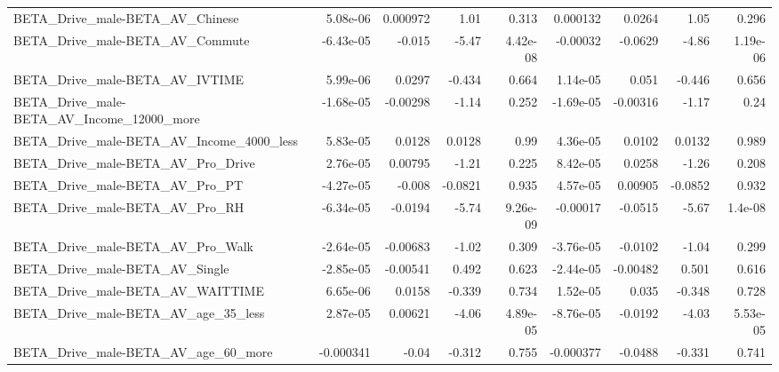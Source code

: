 \begin{tabular}{lrrrrrrrr}
BETA\_Drive\_male-BETA\_AV\_Chinese                    &    5.08e-06 &     0.000972 &      1.01 &    0.313 &   0.000132 &      0.0264 &         1.05 &         0.296 \\
BETA\_Drive\_male-BETA\_AV\_Commute                    &   -6.43e-05 &       -0.015 &     -5.47 & 4.42e-08 &   -0.00032 &     -0.0629 &        -4.86 &      1.19e-06 \\
BETA\_Drive\_male-BETA\_AV\_IVTIME                     &    5.99e-06 &       0.0297 &    -0.434 &    0.664 &   1.14e-05 &       0.051 &       -0.446 &         0.656 \\
BETA\_Drive\_male-BETA\_AV\_Income\_12000\_more          &   -1.68e-05 &     -0.00298 &     -1.14 &    0.252 &  -1.69e-05 &    -0.00316 &        -1.17 &          0.24 \\
BETA\_Drive\_male-BETA\_AV\_Income\_4000\_less           &    5.83e-05 &       0.0128 &    0.0128 &     0.99 &   4.36e-05 &      0.0102 &       0.0132 &         0.989 \\
BETA\_Drive\_male-BETA\_AV\_Pro\_Drive                  &    2.76e-05 &      0.00795 &     -1.21 &    0.225 &   8.42e-05 &      0.0258 &        -1.26 &         0.208 \\
BETA\_Drive\_male-BETA\_AV\_Pro\_PT                     &   -4.27e-05 &       -0.008 &   -0.0821 &    0.935 &   4.57e-05 &     0.00905 &      -0.0852 &         0.932 \\
BETA\_Drive\_male-BETA\_AV\_Pro\_RH                     &   -6.34e-05 &      -0.0194 &     -5.74 & 9.26e-09 &   -0.00017 &     -0.0515 &        -5.67 &       1.4e-08 \\
BETA\_Drive\_male-BETA\_AV\_Pro\_Walk                   &   -2.64e-05 &     -0.00683 &     -1.02 &    0.309 &  -3.76e-05 &     -0.0102 &        -1.04 &         0.299 \\
BETA\_Drive\_male-BETA\_AV\_Single                     &   -2.85e-05 &     -0.00541 &     0.492 &    0.623 &  -2.44e-05 &    -0.00482 &        0.501 &         0.616 \\
BETA\_Drive\_male-BETA\_AV\_WAITTIME                   &    6.65e-06 &       0.0158 &    -0.339 &    0.734 &   1.52e-05 &       0.035 &       -0.348 &         0.728 \\
BETA\_Drive\_male-BETA\_AV\_age\_35\_less                &    2.87e-05 &      0.00621 &     -4.06 & 4.89e-05 &  -8.76e-05 &     -0.0192 &        -4.03 &      5.53e-05 \\
BETA\_Drive\_male-BETA\_AV\_age\_60\_more                &   -0.000341 &        -0.04 &    -0.312 &    0.755 &  -0.000377 &     -0.0488 &       -0.331 &         0.741 \\

\end{tabular}
